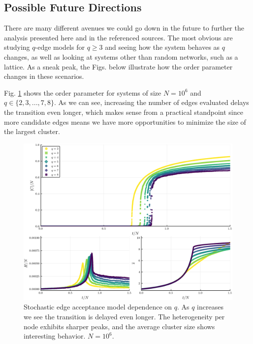 \subsection{Possible Future Directions}
There are many different avenues we could go down in the future to further the analysis presented here and in the referenced sources.
The most obvious are studying $q$-edge models for $q \ge 3$ and seeing how the system behaves as $q$ changes, as well as looking at systems other than random networks, such as a lattice.
As a sneak peak, the Figs. below illustrate how the order parameter changes in these scenarios.

Fig. \ref{fig:q_scaling_triple} shows the order parameter for systems of size $N = 10^6$ and $q \in \{2, 3, ..., 7, 8\}$. As we can see, increasing the number of edges evaluated delays the transition even longer, which makes sense from a practical standpoint since more candidate edges means we have more opportunities to minimize the size of the largest cluster.

\begin{figure}[H]
	\centering
	\includegraphics[width=350pt, clip]{images/q_scaling_triple.png}
	\caption{Stochastic edge acceptance model dependence on $q$. As $q$ increases we see the transition is delayed even longer. The heterogeneity per node exhibits sharper peaks, and the average cluster size shows interesting behavior. $N = 10^6$.}
	\label{fig:q_scaling_triple}
\end{figure}

